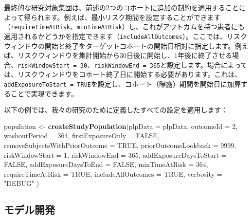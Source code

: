 \documentclass[
  11pt]{book}
\newenvironment{Shaded}{\begin{snugshade}}{\end{snugshade}}
\newcommand{\AttributeTok}[1]{\textcolor[rgb]{0.13,0.29,0.53}{#1}}
\newcommand{\ConstantTok}[1]{\textcolor[rgb]{0.56,0.35,0.01}{#1}}
\newcommand{\DecValTok}[1]{\textcolor[rgb]{0.00,0.00,0.81}{#1}}
\newcommand{\FunctionTok}[1]{\textcolor[rgb]{0.13,0.29,0.53}{\textbf{#1}}}
\newcommand{\NormalTok}[1]{#1}
\newcommand{\OtherTok}[1]{\textcolor[rgb]{0.56,0.35,0.01}{#1}}
\newcommand{\StringTok}[1]{\textcolor[rgb]{0.31,0.60,0.02}{#1}}
\theoremstyle{definition}
\theoremstyle{definition}
\theoremstyle{definition}
\theoremstyle{definition}
\theoremstyle{remark}
\begin{document}
最終的な研究対象集団は、前述の2つのコホートに追加の制約を適用することによって得られます。例えば、最小リスク期間を設定することができます（\texttt{requireTimeAtRisk}、\texttt{minTimeAtRisk}）し、これがアウトカムを持つ患者にも適用されるかどうかを指定できます（\texttt{includeAllOutcomes}）。ここでは、リスクウィンドウの開始と終了をターゲットコホートの開始日相対に指定します。例えば、リスクウィンドウを集計開始から30日後に開始し、1年後に終了させる場合、\texttt{riskWindowStart\ =\ 30}、\texttt{riskWindowEnd\ =\ 365}と設定します。場合によっては、リスクウィンドウをコホート終了日に開始する必要があります。これは、\texttt{addExposureToStart\ =\ TRUE}を設定し、コホート（曝露）期間を開始日に加算することで実現できます。

以下の例では、我々の研究のために定義したすべての設定を適用します：

\begin{Shaded}
\begin{Highlighting}[]
\NormalTok{population }\OtherTok{\textless{}{-}} \FunctionTok{createStudyPopulation}\NormalTok{(}\AttributeTok{plpData =}\NormalTok{ plpData,}
                                    \AttributeTok{outcomeId =} \DecValTok{2}\NormalTok{,}
                                    \AttributeTok{washoutPeriod =} \DecValTok{364}\NormalTok{,}
                                    \AttributeTok{firstExposureOnly =} \ConstantTok{FALSE}\NormalTok{,}
                                    \AttributeTok{removeSubjectsWithPriorOutcome =} \ConstantTok{TRUE}\NormalTok{,}
                                    \AttributeTok{priorOutcomeLookback =} \DecValTok{9999}\NormalTok{,}
                                    \AttributeTok{riskWindowStart =} \DecValTok{1}\NormalTok{,}
                                    \AttributeTok{riskWindowEnd =} \DecValTok{365}\NormalTok{,}
                                    \AttributeTok{addExposureDaysToStart =} \ConstantTok{FALSE}\NormalTok{,}
                                    \AttributeTok{addExposureDaysToEnd =} \ConstantTok{FALSE}\NormalTok{,}
                                    \AttributeTok{minTimeAtRisk =} \DecValTok{364}\NormalTok{,}
                                    \AttributeTok{requireTimeAtRisk =} \ConstantTok{TRUE}\NormalTok{,}
                                    \AttributeTok{includeAllOutcomes =} \ConstantTok{TRUE}\NormalTok{,}
                                    \AttributeTok{verbosity =} \StringTok{"DEBUG"}
\NormalTok{)}
\end{Highlighting}
\end{Shaded}

\subsection{モデル開発}\label{ux30e2ux30c7ux30ebux958bux767a}
\end{document}
